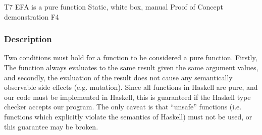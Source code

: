 \documentclass[12pt]{report}
\begin{document}
\systemTest
{T7}
{EFA is a pure function}
{Static, white box, manual}
{Proof of Concept demonstration}
{F4}
\vspace{-12pt}\subsubsection*{Description} 

Two conditions must hold for a function to be considered a pure
function. Firstly, The function always evaluates to the same result given the
same argument values, and secondly, the evaluation of the result does not cause
any semantically observable side effects (e.g. mutation). Since all functions in
Haskell are pure, and our code must be implemented in Haskell, this is
guaranteed if the Haskell type checker accepts our program. The only caveat is
that ``unsafe'' functions (i.e. functions which explicitly violate the semantics
of Haskell) must not be used, or this guarantee may be broken.


	
\end{document}
